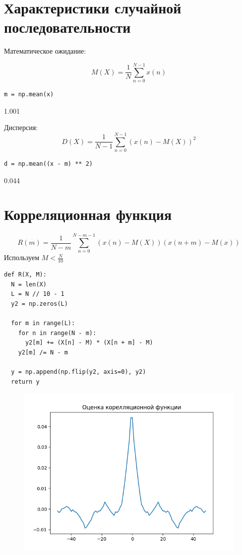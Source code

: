 \documentclass[12pt]{article}
\begin{document}
\section{Характеристики случайной последовательности}
Математическое ожидание:

\[M(X) = \frac{1}{N}\sum_{n=0}^{N - 1}x(n)\]


\begin{lstlisting}
m = np.mean(x)
\end{lstlisting}

1.001

Дисперсия:
\[D(X) = \frac{1}{N - 1}\sum_{n=0}^{N - 1}(x(n) - M(X))^2\]
\begin{lstlisting}
d = np.mean((x - m) ** 2)
\end{lstlisting}

0.044
       

\section{Корреляционная функция}



\[R(m) = \frac{1}{N - m} \sum_{n=0}^{N - m - 1}(x(n) - M(X))(x(n+m) - M(x)) \]
Используем $M < \frac{N}{10}$

\begin{lstlisting}
def R(X, M):
  N = len(X)
  L = N // 10 - 1
  y2 = np.zeros(L)

  for m in range(L):
    for n in range(N - m):
      y2[m] += (X[n] - M) * (X[n + m] - M)
    y2[m] /= N - m

  y = np.append(np.flip(y2, axis=0), y2)
  return y
\end{lstlisting}


\begin{figure}[!htb]
\centering
\includegraphics[scale=1.00]{corell.png}
\caption{}
\label{}

\end{figure}
\end{document}
